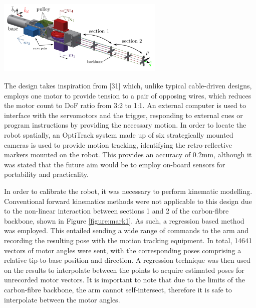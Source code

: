 \documentclass[11pt]{article}
\begin{document}
\begin{center}
\includegraphics[width = 0.6\textwidth]{images/mark1.png}
\label{figure:mark1}
\end{center}

The design takes inspiration from [31] which, unlike typical cable-driven designs, employs one motor
to provide tension to a pair of opposing wires, which reduces the motor count to DoF ratio from 3:2 to 1:1. 
An external computer is used to interface with the servomotors and the trigger, responding to external
cues or program instructions by providing the necessary motion. In order to locate the robot spatially, an OptiTrack system made up of six strategically mounted cameras is
used to provide motion tracking, identifying the retro-reflective markers mounted on the robot. This
provides an accuracy of 0.2mm, although it was stated that the future aim would be to employ
on-board sensors for portability and practicality.


In order to calibrate the robot, it was necessary to perform kinematic modelling. Conventional forward
kinematics methods were not applicable to this design due to the non-linear interaction between sections 1 and 2
of the carbon-fibre backbone, shown in Figure \ref{figure:mark1}. As such, a regression based method was employed.
This entailed sending a wide range of commands to the arm and recording the resulting pose with the
motion tracking equipment. In total, 14641 vectors of motor angles were sent, with the corresponding
poses comprising a relative tip-to-base position and direction. A regression technique
was then used on the results to interpolate between the points to acquire estimated poses for unrecorded
motor vectors. It is important to note that due to the limits
of the carbon-fibre backbone, the arm cannot self-intersect, therefore it is safe to interpolate
between the motor angles.
\end{document}
